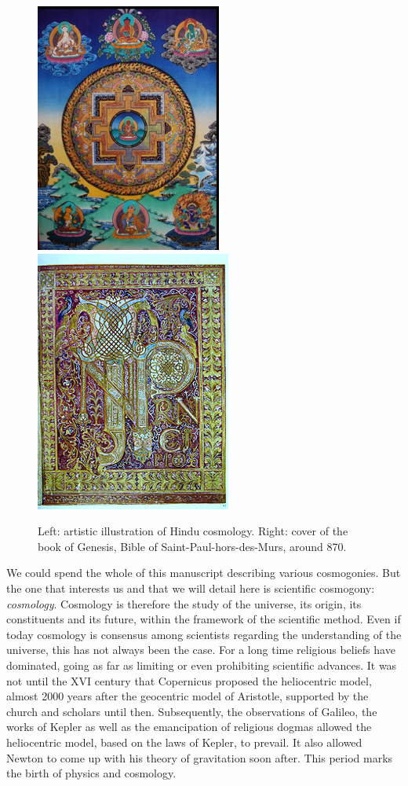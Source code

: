 \documentclass[11pt, twoside, a4paper, openright]{report}
\begin{document}
\begin{figure}
  \centering
  \includegraphics[scale = 1]{cosmohindoue.png}
  \hspace{3cm}
  \includegraphics[scale = 1]{genese.png}
  \caption{Left: artistic illustration of Hindu cosmology. Right: cover of the book of Genesis, Bible of Saint-Paul-hors-des-Murs, around 870.}
  \label{fig: cosmohindoue}
\end{figure}

We could spend the whole of this manuscript describing various cosmogonies. But the one that interests us and that we will detail here is scientific cosmogony: \emph{cosmology}. Cosmology is therefore the study of the universe, its origin, its constituents and its future, within the framework of the scientific method. Even if today cosmology is consensus among scientists regarding the understanding of the universe, this has not always been the case. For a long time religious beliefs have dominated, going as far as limiting or even prohibiting scientific advances.
It was not until the \textsc{XVI} \th century that Copernicus proposed the heliocentric model, almost \num{2000} years after the geocentric model of Aristotle, supported by the church and scholars until then.
Subsequently, the observations of Galileo, the works of Kepler as well as the emancipation of religious dogmas allowed the heliocentric model, based on the laws of Kepler, to prevail. It also allowed Newton to come up with his theory of gravitation soon after. This period marks the birth of physics and cosmology.
\end{document}
